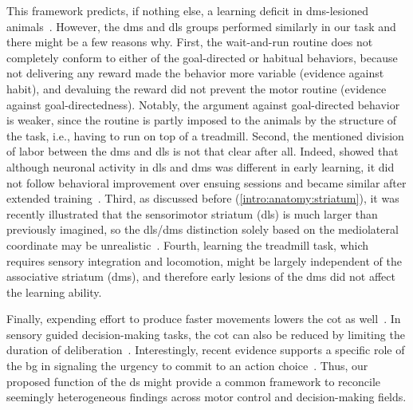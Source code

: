 This framework predicts, if nothing else, a learning deficit in \gls{dms}-lesioned animals~\cite{Hart2018CurrBiol}.
However, the \gls{dms} and \gls{dls} groups performed similarly in our task and there might be a few reasons why.
First, the wait-and-run routine does not completely conform to either of the goal-directed or habitual behaviors, because not delivering any reward made the behavior more variable (evidence against habit), and devaluing the reward did not prevent the motor routine (evidence against goal-directedness).
Notably, the argument against goal-directed behavior is weaker, since the routine is partly imposed to the animals by the structure of the task, i.e., having to run on top of a treadmill.
Second, the mentioned division of labor between the \gls{dms} and \gls{dls} is not that clear after all.
Indeed,  showed that although neuronal activity in \gls{dls} and \gls{dms} was different in early learning, it did not follow behavioral improvement over ensuing sessions and became similar after extended training~\cite{Vandaele2019Elife}.
Third, as discussed before (\autoref{intro:anatomy:striatum}), it was recently illustrated that the sensorimotor striatum (\gls{dls}) is much larger than previously imagined, so the \gls{dls}/\gls{dms} distinction solely based on the mediolateral coordinate may be unrealistic~\cite{Hunnicutt2016, Hintiryan2016NN}.
Fourth, learning the treadmill task, which requires sensory integration and locomotion, might be largely independent of the associative striatum (\gls{dms}), and therefore early lesions of the \gls{dms} did not affect the learning ability.
\par
Finally, expending effort to produce faster movements lowers the \gls{cot} as well~\cite{Shadmehr2019TINS}.
In sensory guided decision-making tasks, the \gls{cot} can also be reduced by limiting the duration of deliberation~\cite{Carland2019NeuroSci}.
Interestingly, recent evidence supports a specific role of the \gls{bg} in signaling the urgency to commit to an action choice~\cite{Thura2017Neruon,Carland2019NeuroSci}.
Thus, our proposed function of the \gls{ds} might provide a common framework to reconcile seemingly heterogeneous findings across motor control and decision-making fields.